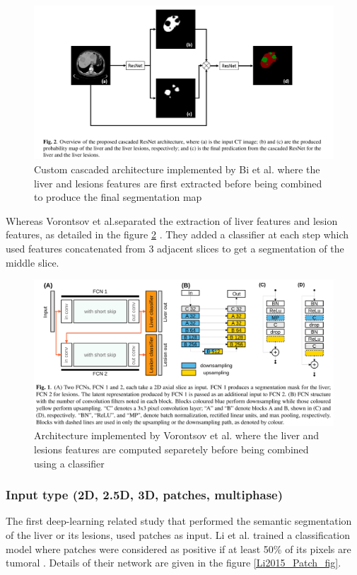 \documentclass[]{article}
\begin{document}
\begin{figure}[th!]
	\centering
	\includegraphics[width=0.7\linewidth]{images/image27}
	\caption{Custom cascaded architecture implemented by Bi et al. where the liver and lesions features are first extracted before being combined to produce the final segmentation map \cite{Bi2017}}
	\label{Bi2017_Fig2}
\end{figure}


Whereas Vorontsov et al.separated the extraction of liver
features and lesion features, as detailed in the figure \ref{Vorontsov2018_Fig1} \cite{Vorontsov2018}. They
added a classifier at each step which used features concatenated from 3
adjacent slices to get a segmentation of the middle slice.

\begin{figure}[th!]
	\centering
	\includegraphics[width=0.7\linewidth]{images/image17}
	\caption{Architecture implemented by Vorontsov et al. where the liver and lesions features are computed separetely before being combined using a classifier \cite{Vorontsov2018}}
	\label{Vorontsov2018_Fig1}
\end{figure}


\subsubsection*{Input type (2D, 2.5D, 3D, patches, multiphase)}

The first deep-learning related study that performed the semantic
segmentation of the liver or its lesions, used patches as input.
Li et al. trained a classification model where patches were
considered as positive if at least 50\% of its pixels are tumoral \cite{Li2015}.
Details of their network are given in the figure \ref{Li2015_Patch_fig}.
\end{document}
